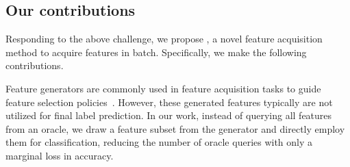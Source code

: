 \documentclass[letterpaper]{article}
\renewcommand{\cite}{\citep}
\begin{document}

\subsection{Our contributions}

Responding to the above challenge,   we propose \our, a novel feature acquisition method to acquire features in batch.
Specifically, we make the following contributions.


Feature generators are commonly used in feature acquisition tasks to guide feature selection policies~\cite{gsm,eddi}. However, these generated features typically are not utilized for final label prediction. In our work, instead of querying all features from an oracle, we draw a feature subset from the generator and directly employ them for classification, reducing the number of oracle queries with only a marginal loss in accuracy.
\end{document}
